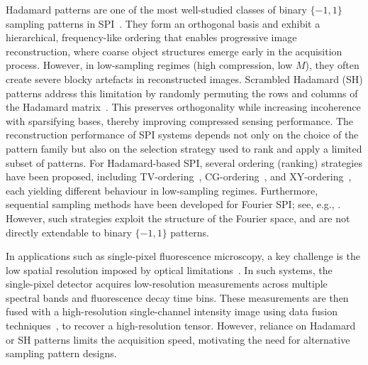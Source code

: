 \documentclass[lettersize,journal]{IEEEtran}
\begin{document}
Hadamard patterns are one of the most well-studied classes of binary $\{-1,1\}$ sampling patterns in SPI~\cite{Gibson_2020_SinglepixelImaging12a, Yu_2020_SuperSubNyquistSinglePixel}. 
They form an orthogonal basis and exhibit a hierarchical, frequency-like ordering that enables progressive image reconstruction, where coarse object structures emerge early in the acquisition process. 
However, in low-sampling regimes (high compression, low $M$), they often create severe blocky artefacts in reconstructed images.
Scrambled Hadamard (SH) patterns address this limitation by randomly permuting the rows and columns of the Hadamard matrix~\cite{Huynh_2019_SinglepixelCameraPhotoacoustic}. 
This preserves orthogonality while increasing incoherence with sparsifying bases, thereby improving compressed sensing performance. 
The reconstruction performance of SPI systems depends not only on the choice of the pattern family but also on the selection strategy used to rank and apply a limited subset of patterns.
For Hadamard-based SPI, several ordering (ranking) strategies have been proposed, including TV-ordering~\cite{Yu_2020_SuperSubNyquistSinglePixel}, CG-ordering~\cite{Yu_2019_SuperSubNyquistSinglePixel}, and XY-ordering~\cite{Cai_2023_DetailenhancedSamplingStrategy}, each yielding different behaviour in low-sampling regimes. Furthermore, sequential sampling methods have been developed for Fourier SPI; see, e.g., \cite{Yuan_2021_AdaptiveDynamicOrdering}. However, such strategies exploit the structure of the Fourier space, and are not directly extendable to binary $\{-1,1\}$ patterns. 

In applications such as single-pixel fluorescence microscopy, a key challenge is the low spatial resolution imposed by optical limitations~\cite{Ebner_2023_DiffractionlimitedHyperspectralMidinfrared}. 
In such systems, the single-pixel detector acquires low-resolution measurements across multiple spectral bands and fluorescence decay time bins.
These measurements are then fused with a high-resolution single-channel intensity image using data fusion techniques~\cite{Jerez_2018_SinglePixelSpectral, Soldevila_2021_GigavoxelMultidimensionalFluorescencea, Ghezzi_2023_ComputationalBasedTimeresolved, Simoni_2026_Computational3DMultispectral}, to recover a high-resolution tensor. 
However, reliance on Hadamard or SH patterns limits the acquisition speed, motivating the need for alternative sampling pattern designs.
\end{document}
